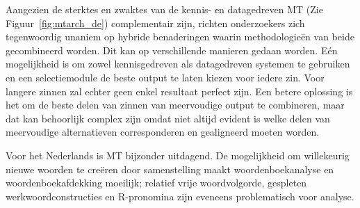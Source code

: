 \begin{multicols}{2}
    Aangezien de sterktes en zwaktes van de kennis- en datagedreven MT (Zie Figuur~\ref{fig:mtarch_de}) complementair zijn, richten onderzoekers zich tegenwoordig unaniem op hybride benaderingen waarin methodologie{\"e}n van beide gecombineerd worden. Dit kan op verschillende manieren gedaan worden. E{\'e}n mogelijkheid is om zowel kennisgedreven als datagedreven systemen te gebruiken en een selectiemodule de beste output te laten kiezen voor iedere zin. Voor langere zinnen zal echter geen enkel resultaat perfect zijn. Een betere oplossing is het om de beste delen van zinnen van meervoudige output te combineren, maar dat kan behoorlijk complex zijn omdat niet altijd evident is welke delen van meervoudige alternatieven corresponderen en gealigneerd moeten worden.


Voor het Nederlands is MT bijzonder uitdagend. De mogelijkheid om willekeurig nieuwe woorden te cre{\"e}ren door samenstelling maakt woordenboekanalyse en woordenboekafdekking moeilijk; relatief vrije woordvolgorde, gespleten werkwoordconstructies en R-pronomina zijn eveneens problematisch voor analyse.


\end{multicols}
